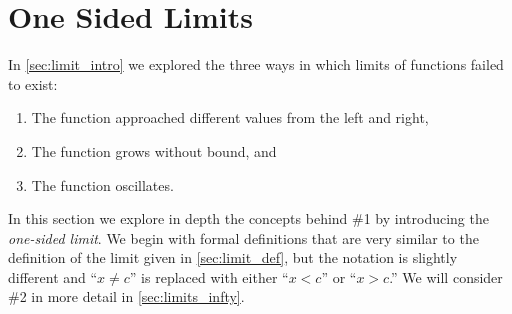 \section{One Sided Limits}\label{sec:limit_continuity}

In \autoref{sec:limit_intro} we explored the three ways in which limits of functions failed to exist: 
	\begin{enumerate}
	\item	The function approached different values from the left and right,
	\item	The function grows without bound, and 
	\item	The function oscillates.
	\end{enumerate}
	
In this section we explore in depth the concepts behind \#1 by introducing the \emph{one-sided limit}. We begin with formal definitions that are very similar to the definition of the limit given in \autoref{sec:limit_def}, but the notation is slightly different and ``$x\neq c$'' is replaced with either ``$x<c$'' or ``$x>c$.'' We will consider \#2 in more detail in \autoref{sec:limits_infty}.


